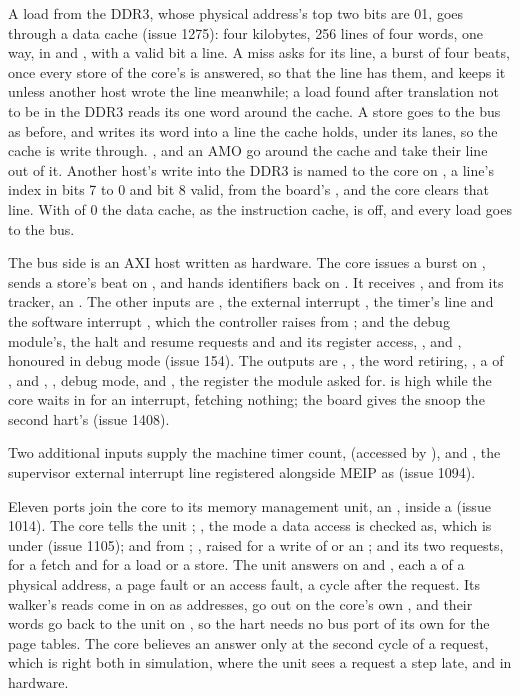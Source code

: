 A load from the DDR3, whose physical address's top two bits are 01,
goes through a data cache (issue 1275): four kilobytes, 256 lines of
four words, one way, in  and , with a
valid bit a line. A miss asks for its line, a burst of four beats,
once every store of the core's is answered, so that the line has them,
and keeps it unless another host wrote the line meanwhile; a load
found after translation not to be in the DDR3 reads its one word
around the cache. A store goes to the bus as before, and writes its word into
a line the cache holds, under its lanes, so the cache is write
through. ,  and an AMO go around the cache and
take their line out of it. Another host's write into the DDR3 is named
to the core on , a line's index in bits 7 to 0 and bit
8 valid, from the board's , and the core clears that
line. With  of 0 the data cache, as the instruction cache, is
off, and every load goes to the bus.

The bus side is an AXI host written as hardware. The core issues a
burst on , sends a store's beat on , and hands
identifiers back on . It receives ,
 and  from its tracker, an . The
other inputs are , the external interrupt , the
timer's line  and the software interrupt , which
the controller raises from ; and the debug module's, the
halt and resume requests  and  and its
register access, ,  and
, honoured in debug mode (issue 154). The outputs are
, , the word retiring, , a
 of ,  and , ,
debug mode, and , the register the module asked for.
 is high while the core waits in  for an
interrupt, fetching nothing; the board gives the snoop the second
hart's (issue 1408).

Two additional inputs supply the machine timer count, 
(accessed by ), and , the supervisor external
interrupt line registered alongside MEIP as  (issue 1094).

Eleven ports join the core to its memory management unit, an
, inside a  (issue 1014). The core tells the
unit ; , the mode a data access is
checked as, which is  under  (issue 1105);
 and  from ;
, raised for a write of
 or an ; and its two requests,
 for a fetch and  for a load or a store. The
unit answers on  and , each a  of a
physical address, a page fault or an access fault, a cycle after the
request. Its walker's reads come in on  as addresses, go out
on the core's own , and their words go back to the unit on
, so the hart needs no bus port of its own for the page
tables. The core believes an answer only at the second cycle of a
request, which is right both in simulation, where the unit sees a
request a step late, and in hardware.

